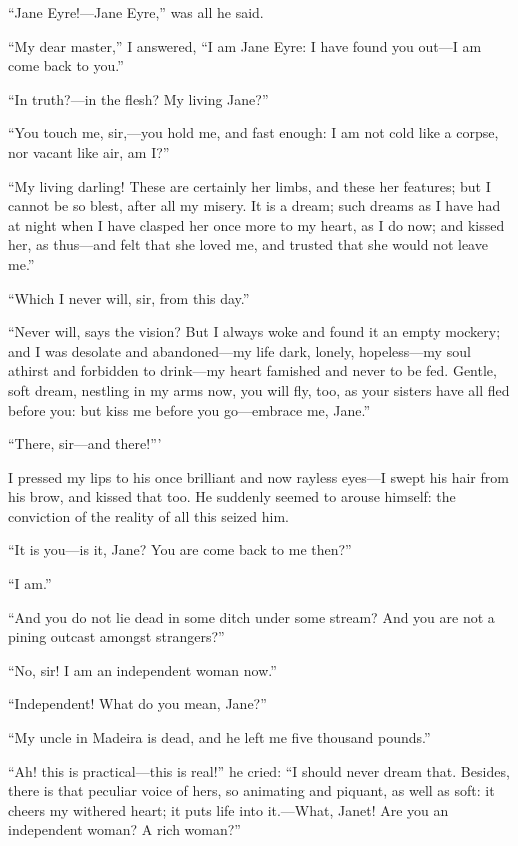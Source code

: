 \enquote{Jane Eyre!---Jane Eyre,} was all he said.

\enquote{My dear master,} I answered, \enquote{I am Jane Eyre: I have
	found you out---I am come back to you.}

\enquote{In truth?---in the flesh? My living Jane?}

\enquote{You touch me, sir,---you hold me, and fast enough: I am not
	cold like a corpse, nor vacant like air, am I?}

\enquote{My living darling! These are certainly her limbs, and these
	her features; but I cannot be so blest, after all my misery. It is a
	dream; such dreams as I have had at night when I have clasped her once
	more to my heart, as I do now; and kissed her, as thus---and felt that
	she loved me, and trusted that she would not leave me.}

\enquote{Which I never will, sir, from this day.}

\enquote{Never will, says the vision? But I always woke and found it an
	empty mockery; and I was desolate and abandoned---my life dark, lonely,
	hopeless---my soul athirst and forbidden to drink---my heart famished
	and never to be fed. Gentle, soft dream, nestling in my arms now, you
	will fly, too, as your sisters have all fled before you: but kiss me
	before you go---embrace me, Jane.}

\enquote{There, sir---and there!}'

I pressed my lips to his once brilliant and now rayless eyes---I swept
his hair from his brow, and kissed that too. He suddenly seemed to
arouse himself: the conviction of the reality of all this seized him.

\enquote{It is you---is it, Jane? You are come back to me then?}

\enquote{I am.}

\enquote{And you do not lie dead in some ditch under some stream? And
	you are not a pining outcast amongst strangers?}

\enquote{No, sir! I am an independent woman now.}

\enquote{Independent! What do you mean, Jane?}

\enquote{My uncle in Madeira is dead, and he left me five thousand
	pounds.}

\enquote{Ah! this is practical---this is real!} he cried: \enquote{I
	should never dream that. Besides, there is that peculiar voice of hers,
	so animating and piquant, as well as soft: it cheers my withered heart;
	it puts life into it.---What, Janet! Are you an independent woman? A
	rich woman?}

